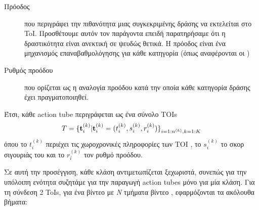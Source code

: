\begin{description}
\item[ Πρόοδος  ] που περιγράφει την πιθανότητα μιας συγκεκριμένης δράσης να εκτελείται στο  \en ToI\gr.
 Προσθέτουμε αυτόν τον παράγοντα επειδή παρατηρήσαμε ότι η δραστικότητα είναι ανεκτική  σε ψευδώς θετικά. Η πρόοδος είναι
 ένα μηχανισμός επαναβαθμολόγησης για κάθε κατηγορία (όπως αναφέρονται οι  \cite{DBLP:journals/corr/abs-1903-00304})

\item [ Ρυθμός προόδου ] που ορίζεται ως η αναλογία προόδου κατά την οποία κάθε κατηγορία δράσης έχει πραγματοποιηθεί.
  
\end{description}

Έτσι, κάθε \en action tube \gr περιγράφεται ως ένα σύνολο \en TOIs \gr  
\[  T = {\{ {\bf t}_i^{(k)} | {\bf t}_i^{(k)} = ( t_i^{(k)}, s_i^{(k)}, r_i^{(k)} ) \}}_{i=1:n^{(k)},k=1:K} \]
όπου το $ t_i^{(k)} $ περιέχει τις χωροχρονικές πληροφορίες των \en TOI \gr, το   $ s_i^{(k)} $ το σκορ σιγουριάς του και
το $ r_i^{(k)} $ τον ρυθμό προόδου.

Σε αυτή την προσέγγιση, κάθε κλάση αντιμετωπίζεται ξεχωριστά, συνεπώς για την υπόλοιπη ενότητα
συζητάμε για την παραγωγή \en action tubes \gr μόνο για μία κλάση. Για τη σύνδεση 2 \en ToIs\gr, για
ένα βίντεο με \textit{N} τμήματα βίντεο , εφαρμόζονται τα ακόλουθα βήματα:

